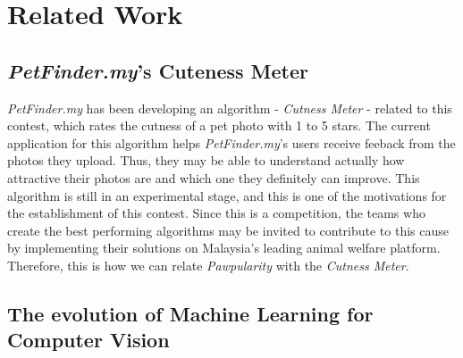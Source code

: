 \documentclass{article}
\begin{document}
\section{Related Work}

\subsection{\textit{PetFinder.my}'s Cuteness Meter}

\textit{PetFinder.my} has been developing an algorithm - \textit{Cutness Meter} \cite{petfinder.my} -  related to this contest, which rates the cutness of a pet photo with 1 to 5 stars. The current application for this algorithm helps \textit{PetFinder.my}'s users receive feeback from the photos they upload. Thus, they may be able to understand actually how attractive their photos are and which one they definitely can improve. This algorithm is still in an experimental stage, and this is one of the motivations for the establishment of this contest. Since this is a competition, the teams who create the best performing algorithms may be invited to contribute to this cause by implementing their solutions on Malaysia’s leading animal welfare platform. Therefore, this is how we can relate \textit{Pawpularity} with the \textit{Cutness Meter}.

\subsection{The evolution of Machine Learning for Computer Vision}
\end{document}
